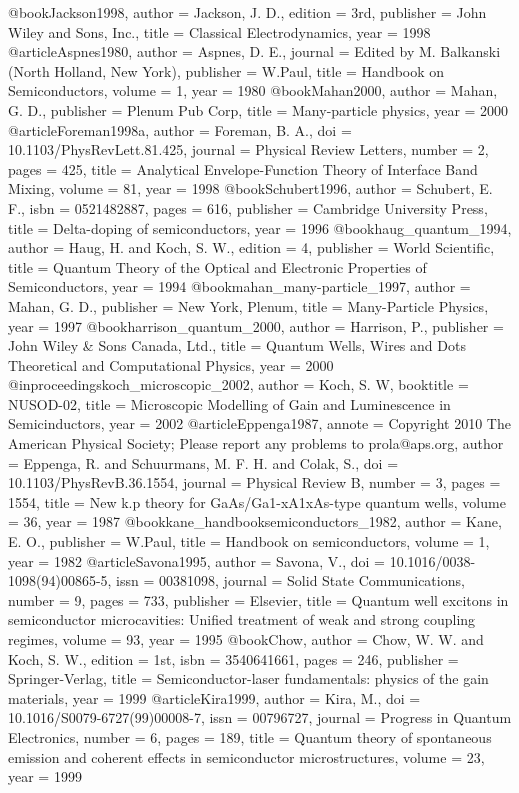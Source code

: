 @book{Jackson1998,
author = {Jackson, J. D.},
edition = {3rd},
publisher = {John Wiley and Sons, Inc.},
title = {{Classical Electrodynamics}},
year = {1998}
}
@article{Aspnes1980,
author = {Aspnes, D. E.},
journal = {Edited by M. Balkanski (North Holland, New York)},
publisher = {W.Paul},
title = {{Handbook on Semiconductors}},
volume = {1},
year = {1980}
}
@book{Mahan2000,
author = {Mahan, G. D.},
publisher = {Plenum Pub Corp},
title = {{Many-particle physics}},
year = {2000}
}
@article{Foreman1998a,
author = {Foreman, B. A.},
doi = {10.1103/PhysRevLett.81.425},
journal = {Physical Review Letters},
number = {2},
pages = {425},
title = {{Analytical Envelope-Function Theory of Interface Band Mixing}},
volume = {81},
year = {1998}
}
@book{Schubert1996,
author = {Schubert, E. F.},
isbn = {0521482887},
pages = {616},
publisher = {Cambridge University Press},
title = {{Delta-doping of semiconductors}},
year = {1996}
}
@book{haug_quantum_1994,
author = {Haug, H. and Koch, S. W.},
edition = {4},
publisher = {World Scientific},
title = {{Quantum Theory of the Optical and Electronic Properties of Semiconductors}},
year = {1994}
}
@book{mahan_many-particle_1997,
author = {Mahan, G. D.},
publisher = {New York, Plenum},
title = {{Many-Particle Physics}},
year = {1997}
}
@book{harrison_quantum_2000,
author = {Harrison, P.},
publisher = {John Wiley & Sons Canada, Ltd.},
title = {{Quantum Wells, Wires and Dots Theoretical and Computational Physics}},
year = {2000}
}
@inproceedings{koch_microscopic_2002,
author = {Koch, S. W},
booktitle = {NUSOD-02},
title = {{Microscopic Modelling of Gain and Luminescence in Semicinductors}},
year = {2002}
}
@article{Eppenga1987,
annote = {Copyright 2010 The American Physical Society; Please report any problems to prola@aps.org},
author = {Eppenga, R. and Schuurmans, M. F. H. and Colak, S.},
doi = {10.1103/PhysRevB.36.1554},
journal = {Physical Review B},
number = {3},
pages = {1554},
title = {{New k.p theory for GaAs/Ga1-xA1xAs-type quantum wells}},
volume = {36},
year = {1987}
}
@book{kane_handbooksemiconductors_1982,
author = {Kane, E. O.},
publisher = {W.Paul},
title = {{Handbook on semiconductors}},
volume = {1},
year = {1982}
}
@article{Savona1995,
author = {Savona, V.},
doi = {10.1016/0038-1098(94)00865-5},
issn = {00381098},
journal = {Solid State Communications},
number = {9},
pages = {733},
publisher = {Elsevier},
title = {{Quantum well excitons in semiconductor microcavities: Unified treatment of weak and strong coupling regimes}},
volume = {93},
year = {1995}
}
@book{Chow,
author = {Chow, W. W. and Koch, S. W.},
edition = {1st},
isbn = {3540641661},
pages = {246},
publisher = {Springer-Verlag},
title = {{Semiconductor-laser fundamentals: physics of the gain materials}},
year = {1999}
}
@article{Kira1999,
author = {Kira, M.},
doi = {10.1016/S0079-6727(99)00008-7},
issn = {00796727},
journal = {Progress in Quantum Electronics},
number = {6},
pages = {189},
title = {{Quantum theory of spontaneous emission and coherent effects in semiconductor microstructures}},
volume = {23},
year = {1999}
}
